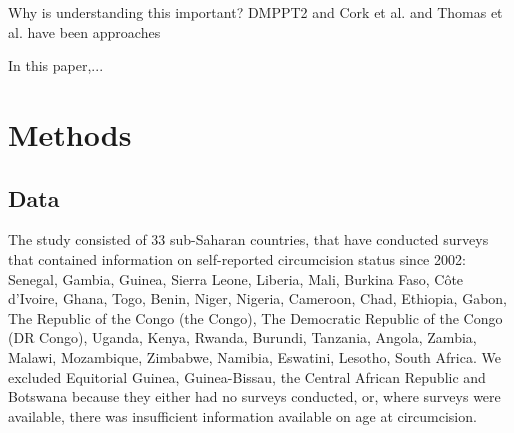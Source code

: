 \documentclass{article}
\begin{document}
Why is understanding this important? DMPPT2 and Cork et al. and Thomas et al. have been approaches 

In this paper,...











\newpage
\section{Methods}
\label{sec:orga131cc6}


\subsection{Data}
\label{sec:org020fc8c}


The study consisted of 33 sub-Saharan countries, that have conducted surveys that contained information on self-reported circumcision status since 2002: Senegal, Gambia, Guinea, Sierra Leone, Liberia, Mali, Burkina Faso, Côte d’Ivoire, Ghana, Togo, Benin, Niger, Nigeria, Cameroon, Chad, Ethiopia, Gabon, The Republic of the Congo (the Congo), The Democratic Republic of the Congo (DR Congo), Uganda, Kenya, Rwanda, Burundi, Tanzania, Angola, Zambia, Malawi, Mozambique, Zimbabwe, Namibia, Eswatini, Lesotho, South Africa. 
We excluded Equitorial Guinea, Guinea-Bissau, the Central African Republic and Botswana because they either had no surveys conducted, or, where surveys were available, there was insufficient information available on age at circumcision.
\end{document}
